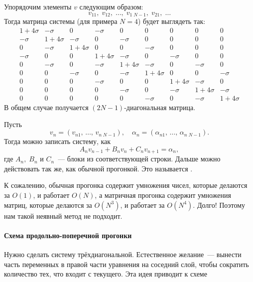 \documentclass{trlnotes}
\begin{document}
    Упорядочим элементы $v$ следующим образом:
    \[
        v_{11}, \; v_{12}, \; \ldots, \; v_{1 \; N-1}, \; v_{21}, \; \ldots
    \]
    Тогда матрица системы (для примера $N=4$) будет выглядеть так:
    \[
        \begin{array}{ccc|ccc|ccc}
        1 + 4\sigma & -\sigma & 0 & -\sigma & 0 & 0 & 0 & 0 & 0 \\
        -\sigma & 1 + 4\sigma & -\sigma & 0 & -\sigma & 0 & 0 & 0 & 0 \\
        0 & -\sigma & 1 + 4\sigma & 0 & 0 & -\sigma & 0 & 0 & 0 \\
        \hline
        -\sigma & 0 & 0 & 1 + 4\sigma & -\sigma & 0 & -\sigma & 0 & 0 \\
        0 & -\sigma & 0 & -\sigma & 1 + 4\sigma & -\sigma & 0 & -\sigma & 0 \\
        0 & 0 & -\sigma & 0 & -\sigma & 1 + 4\sigma & 0 & 0 & -\sigma \\
        \hline
        0 & 0 & 0 & -\sigma & 0 & 0 & 1 + 4\sigma & -\sigma & 0 \\
        0 & 0 & 0 & 0 & -\sigma & 0 &  -\sigma & 1 + 4\sigma & -\sigma \\
        0 & 0 & 0 & 0 & 0 & -\sigma & 0 & -\sigma & 1 + 4\sigma
        \end{array}
    \]
    В общем случае получается $(2N-1)$-диагональная матрица.

    Пусть
    \[
        v_n = (v_{n1}, \, \ldots, \, v_{n \; N-1}), \quad \alpha_n = (\alpha_{n1}, \, \ldots, \, \alpha_{n \; N-1}).
    \]
    Тогда можно записать систему, как
    \[
        A_n v_{n-1} + B_n v_n + C_n v_{n+1} = \alpha_{n},
    \]
    где $A_n, \; B_n$ и $C_n$~--- блоки из соответствующей строки.
    Дальше можно действовать так же, как обычной прогонкой. Это называется .

    К сожалению, обычная прогонка содержит умножения чисел, которые делаются за $O(1)$, и работает $O(N)$, а матричная прогонка содержит умножения матриц, которые делаются за $O(N^3)$, и работает за $O(N^4)$. Долго! Поэтому нам такой неявный метод не подходит.

    \paragraph{Схема продольно-поперечной прогонки}

    Нужно сделать систему трёхдиагональной. Естественное желание~--- вынести часть переменных в правой части уравнения на соседний слой, чтобы сократить количество тех, что входит с текущего. Эта идея приводит к схеме
\end{document}
